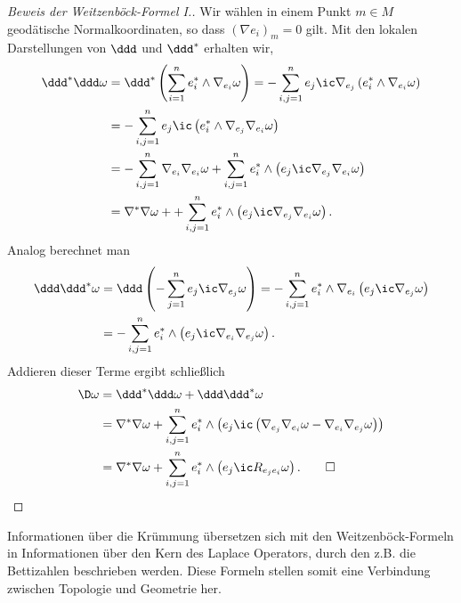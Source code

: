 \documentclass[%
	paper=a5,%
	fleqn,%
	DIV=18,%
	BCOR=0mm,
	fontsize=11pt,
	titlepage=false,%
	bibliography=totoc,
	DIV=18,%
	twoside=true,
	pdftitle=Riemannsche Geometrie,
	pdfauthor=Uwe Semmelmann,
	numbers=noendperiod]%
	{scrbook}
\begin{document}
\begin{proof}[Beweis der Weitzenböck-Formel I.]
Wir wählen in einem Punkt $m\in M$ geodätische Normalkoordinaten, so dass $(\nabla e_{i})_{m} = 0$ gilt. Mit den lokalen Darstellungen von $\ddd$ und $\ddd^*$ erhalten wir,
\begin{align*}
\ddd^*\ddd \omega &= \ddd^* \left(\sum_{i=1}^n e_{i}^* \wedge \nabla_{e_{i}}\omega\right) 
= 
-\sum_{i,j=1}^n e_{j}\ic  \nabla_{e_{j}}\left( e_{i}^* \wedge \nabla_{e_{i}}\omega\right)\\
&=
-\sum_{i,j=1}^n e_{j}\ic  \left( e_{i}^* \wedge \nabla_{e_{j}}\nabla_{e_{i}}\omega\right)\\
&=
-\sum_{i,j=1}^n \nabla_{e_{i}}\nabla_{e_{i}}\omega
+ 
\sum_{i,j=1}^n  e_{i}^* \wedge \left( e_{j} \ic \nabla_{e_{j}}\nabla_{e_{i}}\omega\right)\\
&= \nabla^*\nabla \omega + 
+ 
\sum_{i,j=1}^n  e_{i}^* \wedge \left( e_{j} \ic \nabla_{e_{j}}\nabla_{e_{i}}\omega\right).
\end{align*}
Analog berechnet man
\begin{align*}
\ddd\ddd^*\omega &= 
\ddd\left( -\sum_{j=1}^n e_{j}\ic \nabla_{e_{j}} \omega\right)
= 
 -\sum_{i,j=1}^n e_{i}^* \wedge \nabla_{e_{i}} \left(  e_{j}\ic \nabla_{e_{j}} \omega\right)\\
 &=
 -\sum_{i,j=1}^n e_{i}^* \wedge  \left(  e_{j}\ic \nabla_{e_{i}}\nabla_{e_{j}} \omega\right).
\end{align*}
Addieren dieser Terme ergibt schließlich
\begin{align*}
\D \omega &= \ddd^*\ddd\omega + \ddd\ddd^*\omega \\ 
& = \nabla^*\nabla \omega + \sum_{i,j=1}^n e_{i}^*\wedge \left(
e_{j}\ic \left(\nabla_{e_{j}}\nabla_{e_{i}}\omega - \nabla_{e_{i}}\nabla_{e_{j}}\omega\right)\right)\\
& = \nabla^*\nabla \omega + \sum_{i,j=1}^n e_{i}^*\wedge \left(
e_{j}\ic R_{e_{j}{e_{i}}}\omega\right).\qed
\end{align*}
\end{proof}

Informationen über die Krümmung übersetzen sich mit den Weitzenböck-Formeln in Informationen über den Kern des Laplace Operators, durch den z.B. die Bettizahlen beschrieben werden. Diese Formeln stellen somit eine Verbindung zwischen Topologie und Geometrie her.
\end{document}

